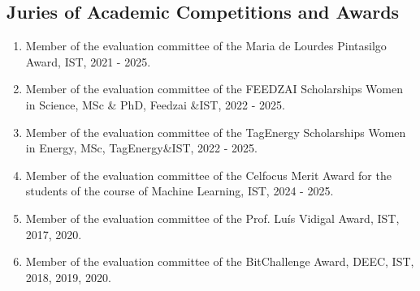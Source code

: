\subsection{Juries of Academic Competitions and
Awards}\label{juries-of-academic-competitions-and-awards}

\begin{enumerate}
\def\labelenumi{\arabic{enumi}.}
\item
  Member of the evaluation committee of the Maria de Lourdes Pintasilgo
  Award, IST, 2021 - 2025.
\item
  Member of the evaluation committee of the FEEDZAI Scholarships Women
  in Science, MSc \& PhD, Feedzai \&IST, 2022 - 2025.
\item
  Member of the evaluation committee of the TagEnergy Scholarships Women
  in Energy, MSc, TagEnergy\&IST, 2022 - 2025.
\item
  Member of the evaluation committee of the Celfocus Merit Award for the
  students of the course of Machine Learning, IST, 2024 - 2025.
\item
  Member of the evaluation committee of the Prof. Luís Vidigal Award,
  IST, 2017, 2020.
\item
  Member of the evaluation committee of the BitChallenge Award, DEEC,
  IST, 2018, 2019, 2020.
\end{enumerate}
